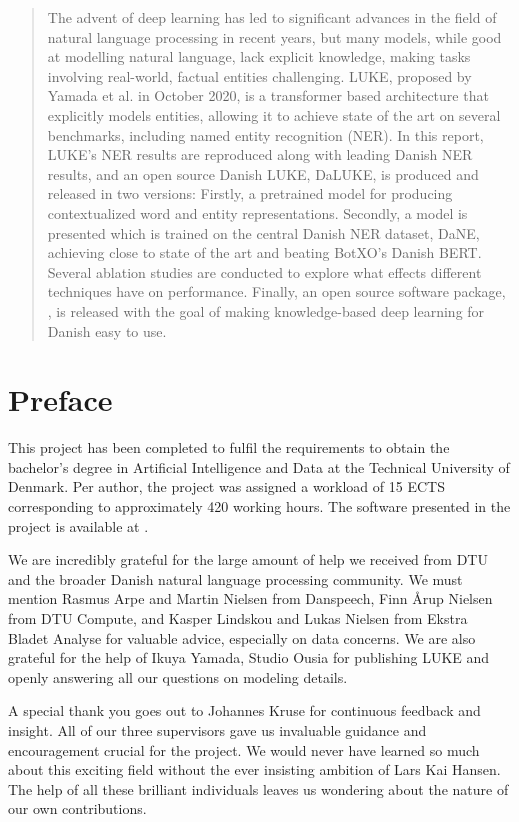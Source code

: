 \documentclass[12pt, fleqn]{report}
\begin{document}
\begin{abstract}
    The advent of deep learning has led to significant advances in the field of natural language processing in recent years, but many models, while good at modelling natural language, lack explicit knowledge, making tasks involving real-world, factual entities challenging.
    LUKE, proposed by Yamada et al. in October 2020, is a transformer based architecture that explicitly models entities, allowing it to achieve state of the art on several benchmarks, including named entity recognition (NER).
    In this report, LUKE's NER results are reproduced along with leading Danish NER results, and an open source Danish LUKE, DaLUKE, is produced and released in two versions:
    Firstly, a pretrained model for producing contextualized word and entity representations.
    Secondly, a model is presented which is trained on the central Danish NER dataset, DaNE, achieving close to state of the art and beating BotXO's Danish BERT.
    Several ablation studies are conducted to explore what effects different techniques have on performance.
    Finally, an open source software package, , is released with the goal of making knowledge-based deep learning for Danish easy to use.
\end{abstract}

\chapter*{Preface}
This project has been completed to fulfil the requirements to obtain the bachelor's degree in Artificial Intelligence and Data at the Technical University of Denmark.
Per author, the project was assigned a workload of 15 ECTS corresponding to approximately 420 working hours.
The software presented in the project is available at .

We are incredibly grateful for the large amount of help we received from DTU and the broader Danish natural language processing community.
We must mention Rasmus Arpe and Martin Nielsen from Danspeech, Finn Årup Nielsen from DTU Compute, and Kasper Lindskou and Lukas Nielsen from Ekstra Bladet Analyse for valuable advice, especially on data concerns.
We are also grateful for the help of Ikuya Yamada, Studio Ousia for publishing LUKE and openly answering all our questions on modeling details.

A special thank you goes out to Johannes Kruse for continuous feedback and insight.
All of our three supervisors gave us invaluable guidance and encouragement crucial for the project.
We would never have learned so much about this exciting field without the ever insisting ambition of Lars Kai Hansen.
The help of all these brilliant individuals leaves us wondering about the nature of our own contributions.
\end{document}
